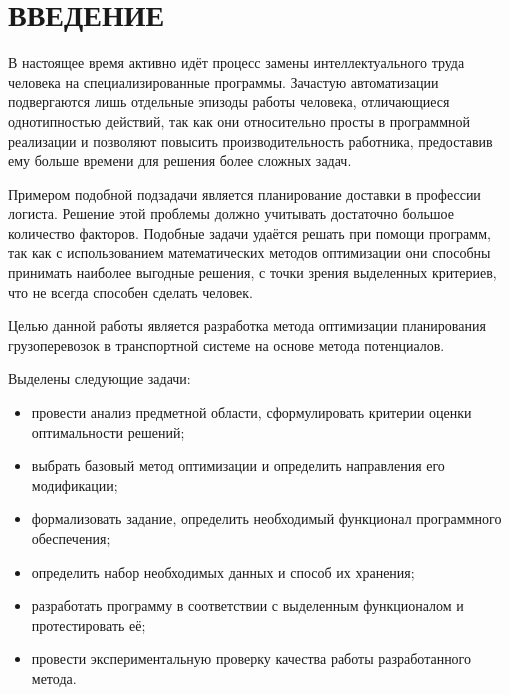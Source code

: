 \section*{ВВЕДЕНИЕ}

В настоящее время активно идёт процесс замены интеллектуального труда человека на специализированные программы. Зачастую автоматизации подвергаются лишь отдельные эпизоды работы человека, отличающиеся однотипностью действий, так как они относительно просты в программной реализации и позволяют повысить производительность работника, предоставив ему больше времени для решения более сложных задач.

Примером подобной подзадачи является планирование доставки в профессии логиста. Решение этой проблемы должно учитывать достаточно большое количество факторов. Подобные задачи удаётся решать при помощи программ, так как с использованием математических методов оптимизации они способны принимать наиболее выгодные решения, с точки зрения выделенных критериев, что не всегда способен сделать человек.

Целью данной работы является разработка метода оптимизации планирования грузоперевозок в транспортной системе на основе метода потенциалов.

Выделены следующие задачи:
\begin{itemize}
	\item провести анализ предметной области, сформулировать критерии оценки оптимальности решений;
	\item выбрать базовый метод оптимизации и определить направления его модификации;
	\item формализовать задание, определить необходимый функционал программного обеспечения;
	\item определить набор необходимых данных и способ их хранения;
	\item разработать программу в соответствии с выделенным функционалом и протестировать её;
	\item провести экспериментальную проверку качества работы разработанного метода.
\end{itemize}

\pagebreak